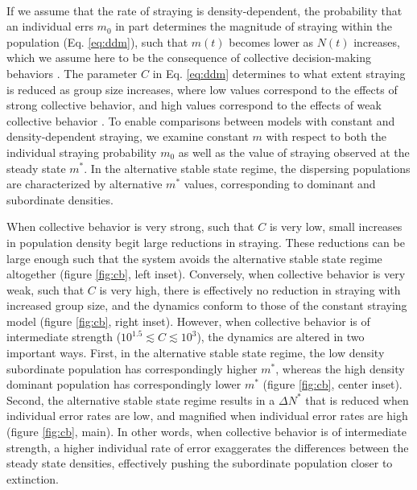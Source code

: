 \documentclass{revtex4}
\begin{document}
 \\
If we assume that the rate of straying is density-dependent, the probability that an individual errs $m_0$ in part determines the magnitude of straying within the population (Eq. \ref{eq:ddm}), such that $m(t)$ becomes lower as $N(t)$ increases, which we assume here to be the consequence of collective decision-making behaviors \citep{Berdahl:2016dx}.
The parameter $C$ in Eq. \ref{eq:ddm} determines to what extent straying is reduced as group size increases, where low values correspond to the effects of strong collective behavior, and high values correspond to the effects of weak collective behavior \cite{Berdahl:2016dx}.
To enable comparisons between models with constant and density-dependent straying, we examine constant $m$ with respect to both the individual straying probability $m_0$ as well as the value of straying observed at the steady state $m^*$.
In the alternative stable state regime, the dispersing populations are characterized by alternative $m^*$ values, corresponding to dominant and subordinate densities.

When collective behavior is very strong, such that $C$ is very low, small increases in population density begit large reductions in straying.
These reductions can be large enough such that the system avoids the alternative stable state regime altogether (figure \ref{fig:cb}, left inset).
Conversely, when collective behavior is very weak, such that $C$ is very high, there is effectively no reduction in straying with increased group size, and the dynamics conform to those of the constant straying model (figure \ref{fig:cb}, right inset).
However, when collective behavior is of intermediate strength ($10^{1.5} \lesssim C \lesssim 10^3$), the dynamics are altered in two important ways.
First, in the alternative stable state regime, the low density subordinate population has correspondingly higher $m^*$, whereas the high density dominant population has correspondingly lower $m^*$ (figure \ref{fig:cb}, center inset).
Second, the alternative stable state regime results in a $\Delta N^*$ that is reduced when individual error rates are low, and magnified when individual error rates are high (figure \ref{fig:cb}, main).
In other words, when collective behavior is of intermediate strength, a higher individual rate of error exaggerates the differences between the steady state densities, effectively pushing the subordinate population closer to extinction.
\end{document}
